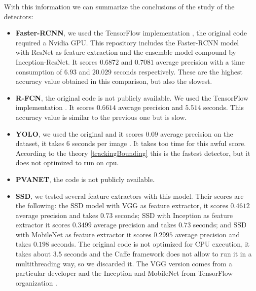 With this information we can summarize the conclusions of the study of the detectors:

\begin{itemize}

\item \textbf{Faster-RCNN}, we used the TensorFlow implementation \cite{tensorObjectdte}, the original code required a Nvidia GPU. This repository includes the Faster-RCNN model with ResNet as feature extraction and the ensemble model compound by Inception-ResNet. It scores $0.6872$ and $0.7081$ average precision with a time consumption of  $6.93$ and  $20.029$ seconds respectively. These are the highest accuracy value obtained in this comparison, but also the slowest.



\item \textbf{R-FCN}, the original code is not publicly available. We used the TensorFlow implementation \cite{tensorObjectdte}. It scores $0.6614$ average precision and $5.514$ seconds. This accuracy value is similar to the previous one but is slow.


\item \textbf{YOLO}, we used the original and it scores $0.09$ average precision on the dataset, it takes $6$ seconds per image \cite{yoloDark}. It takes too time for this awful score. According to the theory \ref{trackingBounding} this is the fastest detector, but it does not optimized to run on cpu.

\item \textbf{PVANET}, the code is not publicly available.

\item \textbf{SSD}, we tested several feature extractors with this model. Their scores are the following: the SSD model with VGG as feature extractor, it scores $0.4612$ average precision and takes $0.73$ seconds; SSD with Inception as feature extractor it scores $0.3499$ average precision and takes $0.73$ seconds; and SSD with MobileNet as feature extractor it scores $0.2995$ average precision and  takes $0.198$ seconds. The original code \cite{ssdCode2} is not optimized for CPU execution, it takes about $3.5$ seconds and the Caffe framework does not allow to run it in a multithreading way, so we discarded it. The VGG version comes from a particular developer \cite{ssdCode} and the Inception and MobileNet from TensorFlow organization \cite{tensorObjectdte}.


\end{itemize}

